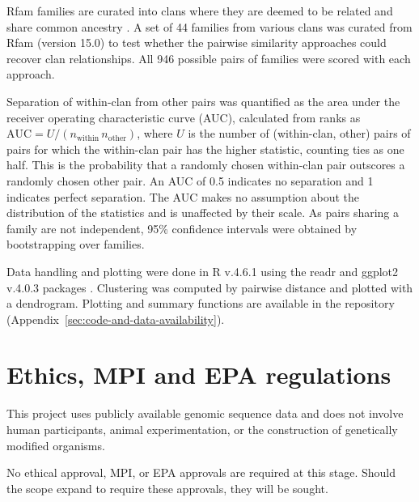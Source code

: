 \label{subsec:clan-benchmark}

Rfam families are curated into clans where they are deemed to be related and share common ancestry \citep{Ontiveros-Palacios2025}.
A set of 44 families from various clans was curated from Rfam (version 15.0) to test whether the pairwise similarity approaches could recover clan relationships.
All 946 possible pairs of families were scored with each approach.

Separation of within-clan from other pairs was quantified as the area under the receiver operating characteristic curve (AUC), calculated from ranks as
$\mathrm{AUC} = U / (n_{\mathrm{within}}\, n_{\mathrm{other}})$, where $U$ is the number of (within-clan, other) pairs of pairs for which the within-clan pair has the higher statistic, counting ties as one half. 
This is the probability that a randomly chosen within-clan pair outscores a randomly chosen other pair. 
An AUC of 0.5 indicates no separation and 1 indicates perfect separation. 
The AUC makes no assumption about the distribution of the statistics and is unaffected by their scale. As pairs sharing a family are not independent, 95\% confidence intervals were obtained by bootstrapping over families.

Data handling and plotting were done in R v.4.6.1 using the readr and ggplot2 v.4.0.3 packages \citep{Wickham2016}.
Clustering was computed by pairwise distance and plotted with a dendrogram.
Plotting and summary functions are available in the repository (Appendix~\ref{sec:code-and-data-availability}).


\section{Ethics, MPI and EPA regulations}

This project uses publicly available genomic sequence data and does not involve human participants, animal experimentation, or the construction of genetically modified organisms.

No ethical approval, MPI, or EPA approvals are required at this stage. 
Should the scope expand to require these approvals, they will be sought.
